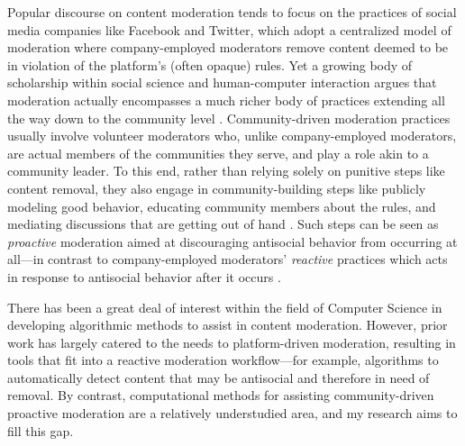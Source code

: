 \documentclass[11pt,letterpaper]{article}
\begin{document}
Popular discourse on content moderation tends to focus on the practices of social media companies like Facebook and Twitter, which adopt a centralized model of moderation where company-employed moderators remove content deemed to be in violation of the platform's (often opaque) rules.
Yet a growing body of scholarship within social science and human-computer interaction argues that moderation actually encompasses a much richer body of practices extending all the way down to the community level \cite{brewer_inclusion_2020,lampe_slashdot_2004,seering_reconsidering_2020}.
Community-driven moderation practices usually involve volunteer moderators who, unlike company-employed moderators, are actual members of the communities they serve, and play a role akin to a community leader.
To this end, rather than relying solely on punitive steps like content removal, they also engage in community-building steps like publicly modeling good behavior, educating community members about the rules, and mediating discussions that are getting out of hand \cite{seering_shaping_2017,billings_understanding_2010}.
Such steps can be seen as \emph{proactive} moderation aimed at discouraging antisocial behavior from occurring at all---in contrast to company-employed moderators' \emph{reactive} practices which acts in response to antisocial behavior after it occurs \cite{lo_when_2018}.

There has been a great deal of interest within the field of Computer Science in developing algorithmic methods to assist in content moderation.
However, prior work has largely catered to the needs to platform-driven moderation, resulting in tools that fit into a reactive moderation workflow---for example, algorithms to automatically detect content that may be antisocial and therefore in need of removal.
By contrast, computational methods for assisting community-driven proactive moderation are a relatively understudied area, and my research aims to fill this gap.


\end{document}
